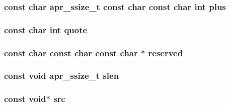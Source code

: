 \subsubsection[{\texorpdfstring{plus}{plus}}]{\setlength{\rightskip}{0pt plus 5cm}const char {\bf apr\+\_\+ssize\+\_\+t} const char const char {\bf int} plus}\hypertarget{group__APR__Util__Escaping_ga3e74db3f8ac18e5493d8ee6ca2e77078}{}\label{group__APR__Util__Escaping_ga3e74db3f8ac18e5493d8ee6ca2e77078}
\subsubsection[{\texorpdfstring{quote}{quote}}]{\setlength{\rightskip}{0pt plus 5cm}const char {\bf int} quote}\hypertarget{group__APR__Util__Escaping_gaae211dea60c8fe440abf2fb32c0985bc}{}\label{group__APR__Util__Escaping_gaae211dea60c8fe440abf2fb32c0985bc}
\subsubsection[{\texorpdfstring{reserved}{reserved}}]{\setlength{\rightskip}{0pt plus 5cm}const char const char const char $\ast$ reserved}\hypertarget{group__APR__Util__Escaping_ga8934de0ca6ba44b94f1e61b77c1dda41}{}\label{group__APR__Util__Escaping_ga8934de0ca6ba44b94f1e61b77c1dda41}
\subsubsection[{\texorpdfstring{slen}{slen}}]{\setlength{\rightskip}{0pt plus 5cm}const {\bf void} {\bf apr\+\_\+ssize\+\_\+t} slen}\hypertarget{group__APR__Util__Escaping_ga00eba03f583932b8cdcec6e0847f08b3}{}\label{group__APR__Util__Escaping_ga00eba03f583932b8cdcec6e0847f08b3}
\subsubsection[{\texorpdfstring{src}{src}}]{\setlength{\rightskip}{0pt plus 5cm}const {\bf void}$\ast$ src}\hypertarget{group__APR__Util__Escaping_gab3b4066b211a3d1de8f72e90b2bca8ab}{}\label{group__APR__Util__Escaping_gab3b4066b211a3d1de8f72e90b2bca8ab}

